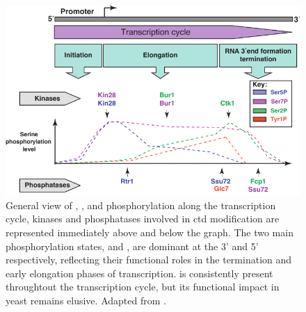 \begin{figure}[ht]

\centering
\includegraphics[width=\textwidth]{figures/introduction/ctdPhospho}
\caption[CTD phosphorylation states throughout the transcription cycle.]{
General view of \sert{}, \serf{}, and \sers{} phosphorylation along the transcription cycle,
kinases and phosphatases involved in \gls{ctd} modification are represented immediately above and below the graph.
The two main phosphorylation states, \sert{} and \serf{}, are dominant at the 3' and 5' respectively, reflecting their functional roles in the termination and early elongation phases of transcription.
\sers{} is consistently present throughtout the transcription cycle, but its functional impact in yeast remains elusive. Adapted from \citep{egloff:2012:updating}.
}
\label{fig:ctdPhospho}

\end{figure}

